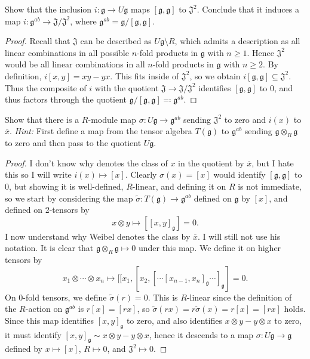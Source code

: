 \begin{exercise}\label{7.4.1}
	Show that the inclusion $i : \mathfrak{g}  \to U\mathfrak{g} $ maps $[\mathfrak{g} ,\mathfrak{g} ]$ to $\mathfrak{J}^2$. Conclude that it induces a map $i : \mathfrak{g} ^{ab}  \to \mathfrak{J} /\mathfrak{J} ^2$, where $\mathfrak{g} ^{ab} =\mathfrak{g} /[\mathfrak{g} ,\mathfrak{g} ]$.
\end{exercise}
\begin{proof}
	Recall that $\mathfrak{J} $ can be described as $U\mathfrak{g} \setminus R$, which admits a description as all linear combinations in all possible $n$-fold products in $\mathfrak{g} $ with $n\geq 1$. Hence $\mathfrak{J} ^2$ would be all linear combinations in all $n$-fold products in $\mathfrak{g} $ with $n\geq 2$. By definition, $i[x,y]=xy-yx$. This fits inside of $\mathfrak{J} ^2$, so we obtain $i[\mathfrak{g} ,\mathfrak{g} ]\subseteq \mathfrak{J} ^2$. Thus the composite of $i$ with the quotient $\mathfrak{J} \to \mathfrak{J} /\mathfrak{J} ^2$ identifies $[\mathfrak{g} ,\mathfrak{g} ]$ to $0$, and thus factors through the quotient $\mathfrak{g} /[\mathfrak{g} ,\mathfrak{g} ]\eqqcolon \mathfrak{g} ^{ab} $.
\end{proof}
\begin{exercise}\label{7.4.2}
	Show that there is a $R$-module map $\sigma : U\mathfrak{g}  \to \mathfrak{g}^{ab}  $ sending $\mathfrak{J} ^2$ to zero and $i(x)$ to $\overline{x} $. \emph{Hint:} First define a map from the tensor algebra $T(\mathfrak{g} )$ to $\mathfrak{g} ^{ab} $ sending $\mathfrak{g} \otimes _R\mathfrak{g} $ to zero and then pass to the quotient $U\mathfrak{g} $.
\end{exercise}
\begin{proof}
	I don't know why \cite{weibel} denotes the class of $x$ in the quotient by $\overline{x} $, but I hate this so I will write $i(x)\mapsto [x]$. Clearly $\sigma (x) = [x]$ would identify $[\mathfrak{g} ,\mathfrak{g} ]$ to 0, but showing it is well-defined, $R$-linear, and defining it on $R$ is not immediate, so we start by considering the map $\widetilde{\sigma } : T(\mathfrak{g})  \to \mathfrak{g}^{ab} $ defined on $\mathfrak{g} $ by $[x]$, and defined on 2-tensors by
	\[
		x\otimes y\mapsto [ [x,y]_\mathfrak{g} ]=0
	.\]
	I now understand why Weibel denotes the class by $\overline{x} $. I will still not use his notation. It is clear that $\mathfrak{g} \otimes _R\mathfrak{g} \mapsto 0$ under this map. We define it on higher tensors by
	\[
		x_1\otimes \cdots \otimes x_n \mapsto [[x_1,[x_2, [\cdots [x_{n-1} ,x_n]_\mathfrak{g} \cdots ]_\mathfrak{g} ]=0
	.\]
	On 0-fold tensors, we define $\widetilde{\sigma } (r) = 0$. This is $R$-linear since the definition of the $R$-action on $\mathfrak{g} ^{ab} $ is $r[x]=[rx]$, so $\widetilde{\sigma } (rx) = r \widetilde{\sigma } (x) = r[x]=[rx]$ holds. Since this map identifies $[x,y]_\mathfrak{g} $ to zero, and also identifies $x\otimes y-y\otimes x$ to zero, it must identify $[x,y]_\mathfrak{g} \sim x\otimes y-y\otimes x$, hence it descends to a map $\sigma : U\mathfrak{g}  \to \mathfrak{g} $ defined by $x\mapsto [x]$, $R\mapsto 0$, and $\mathfrak{J} ^2 \mapsto 0$. 
\end{proof}

